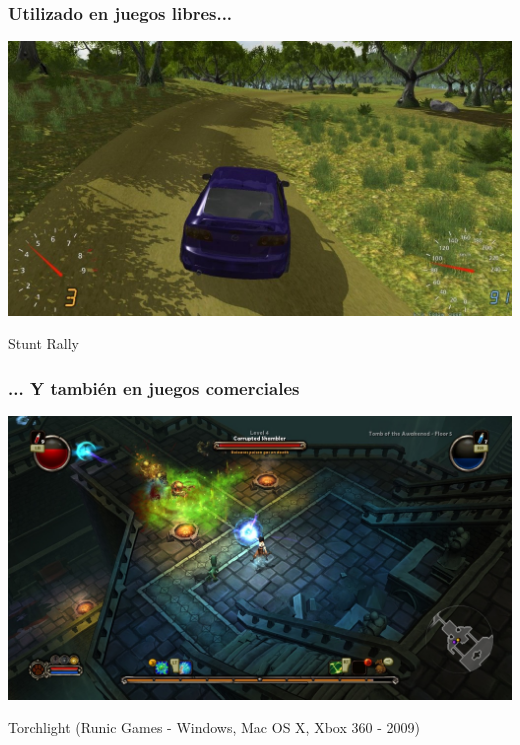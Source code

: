\documentclass[green]{beamer}
\begin{document}
\begin{frame}
    \frametitle{Utilizado en juegos libres...}
    
    \begin{center}
	\includegraphics[scale=0.25]{img/stuntrally.jpg}
	    
	\tiny{Stunt Rally}
    \end{center}
\end{frame}

\begin{frame}
    \frametitle{... Y también en juegos comerciales}
    
    \begin{center}
	\includegraphics[scale=0.22]{img/torchlight.jpg}
	    
	\tiny{Torchlight (Runic Games - Windows, Mac OS X, Xbox 360 - 2009)}
    \end{center}
\end{frame}
\end{document}
